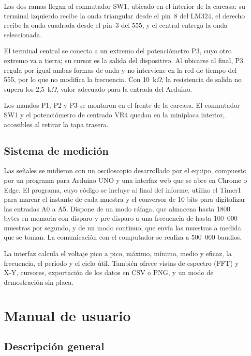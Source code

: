\documentclass[conference]{IEEEtran}
\begin{document}
Las dos ramas llegan al conmutador SW1, ubicado en el interior de la carcasa: su terminal izquierdo recibe la onda triangular desde el pin~8 del LM324, el derecho recibe la onda cuadrada desde el pin~3 del 555, y el central entrega la onda seleccionada.

El terminal central se conecta a un extremo del potenciómetro P3, cuyo otro extremo va a tierra; su cursor es la salida del dispositivo. Al ubicarse al final, P3 regula por igual ambas formas de onda y no interviene en la red de tiempo del 555, por lo que no modifica la frecuencia. Con 10~k$\Omega$, la resistencia de salida no supera los 2,5~k$\Omega$, valor adecuado para la entrada del Arduino.

Los mandos P1, P2 y P3 se montaron en el frente de la carcasa. El conmutador SW1 y el potenciómetro de centrado VR4 quedan en la miniplaca interior, accesibles al retirar la tapa trasera.

\subsection{Sistema de medición}

Las señales se midieron con un osciloscopio desarrollado por el equipo, compuesto por un programa para Arduino UNO y una interfaz web que se abre en Chrome o Edge. El programa, cuyo código se incluye al final del informe, utiliza el Timer1 para marcar el instante de cada muestra y el conversor de 10 bits para digitalizar las entradas A0 a A5. Dispone de un modo ráfaga, que almacena hasta 1800 bytes en memoria con disparo y pre-disparo a una frecuencia de hasta 100~000 muestras por segundo, y de un modo continuo, que envía las muestras a medida que se toman. La comunicación con el computador se realiza a 500~000 baudios.

La interfaz calcula el voltaje pico a pico, máximo, mínimo, medio y eficaz, la frecuencia, el período y el ciclo útil. También ofrece vistas de espectro (FFT) y X-Y, cursores, exportación de los datos en CSV o PNG, y un modo de demostración sin placa.

\section{Manual de usuario}

\subsection{Descripción general}
\end{document}
